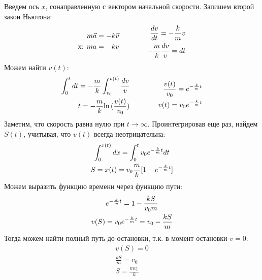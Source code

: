 \documentclass[a5paper,10pt]{article}
\begin{document}
Введем ось $x$, сонаправленную с вектором начальной скорости.
Запишем второй закон Ньютона:
\begin{equation*}
    \xdef\km{\frac{k}{m}}\xdef\mk{\frac{m}{k}}\xdef\mgk{\frac{mg}{k}}%
    \begin{aligned}[c]
        m\vec{a}&=-k\vec{v}\\
        \text{x: } ma&=-kv\\
    \end{aligned}
        \qquad\qquad
    \begin{aligned}[c]
        \frac{dv}{dt}=-\km{}v\\
        -\mk\frac{dv}{v}=dt\\
    \end{aligned}
\end{equation*}
Можем найти $v(t)$:
\begin{equation*}
    \begin{aligned}[c]
        \int_0^{t}dt=-\mk\int_{v_0}^{v(t)}\frac{dv}{v}\\
        t=-\mk{\ln{(\frac{v(t)}{v_0})}}\\
    \end{aligned}
        \qquad\qquad
    \begin{aligned}[c]
        \frac{v(t)}{v_0}=e^{-\km{t}}\\
        v(t)=v_0e^{-\km{t}}\\
    \end{aligned}
\end{equation*}
Заметим, что скорость равна нулю при $t\rightarrow\infty$.
Проинтегрировав еще раз, найдем $S(t)$, учитывая, что $v(t)$ всегда неотрицательна:
\begin{gather*}
    \int_0^{x(t)} dx = \int_0^t v_0e^{-\km{t}} dt\\
    S=x(t)=v_0\mk{}[1-e^{-\km{t}}]
\end{gather*}
Можем выразить функцию времени через функцию пути:
\begin{gather*}
    e^{-\km{t}}=1-\frac{kS}{v_0m}\\
    v(S)=v_0e^{-\km{t}}=v_0-\frac{kS}{m}
\end{gather*}
Тогда можем найти полный путь до остановки, т.к. в момент остановки $v=0$:
\begin{gather*}
    v(S)=0\\
    \frac{kS}{m}=v_0\\
    S=\frac{mv_0}{k}  
\end{gather*}
\end{document}
